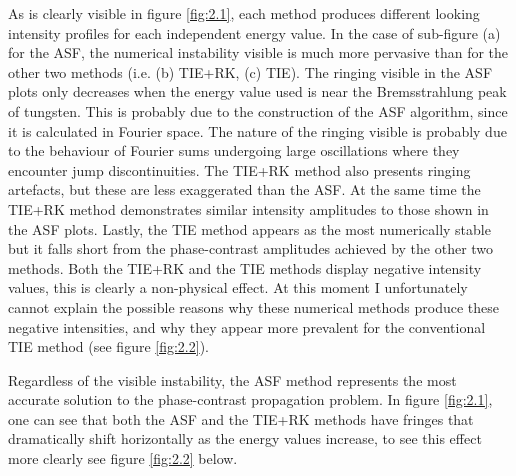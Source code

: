 \documentclass[10pt, a4paper, singlespacing]{report}
\begin{document}
As is clearly visible in figure \ref{fig:2.1}, each method produces different looking intensity profiles for each independent energy value. In the case of sub-figure (a) for the ASF, the numerical instability visible is much more pervasive than for the other two methods (i.e. (b) TIE+RK, (c) TIE). The ringing visible in the ASF plots only decreases when the energy value used is near the Bremsstrahlung peak of tungsten. This is probably due to the construction of the ASF algorithm, since it is calculated in Fourier space. The nature of the ringing visible is probably due to the behaviour of Fourier sums undergoing large oscillations where they encounter jump discontinuities. The TIE+RK method also presents  ringing artefacts, but these are less exaggerated than the ASF. At the same time the TIE+RK method demonstrates similar intensity amplitudes to those shown in the ASF plots.
Lastly, the TIE method appears as the most numerically stable but it falls short from the phase-contrast amplitudes achieved by the other two methods.
Both the TIE+RK and the TIE methods display negative intensity values, this is clearly a non-physical effect. At this moment I unfortunately cannot explain the possible reasons why these numerical methods produce these negative intensities, and why they appear more prevalent for the conventional TIE method (see figure \ref{fig:2.2}). 

Regardless of the visible instability, the ASF method represents the most accurate solution to the phase-contrast propagation problem. In figure \ref{fig:2.1}, one can see that both the ASF and the TIE+RK methods have fringes that dramatically shift horizontally as the energy values increase, to see this effect more clearly see figure \ref{fig:2.2} below.
\end{document}
